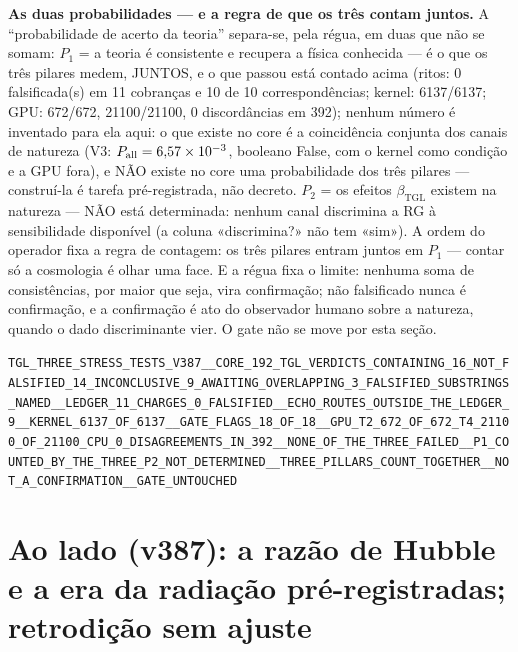 \documentclass[11pt]{article}
\newcommand{\bTGL}{\beta_{\mathrm{TGL}}}\newcommand{\Msun}{M_{\odot}}\newcommand{\TGL}{\mathrm{TGL}}
\theoremstyle{definition}\newtheorem{deriv}{Derivação}
\begin{document}
\textbf{As duas probabilidades --- e a regra de que os três contam juntos.} A ``probabilidade de acerto da teoria'' separa-se, pela régua, em duas que não se somam: $P_1$ = a teoria é consistente e recupera a física conhecida --- é o que os três pilares medem, JUNTOS, e o que passou está contado acima (ritos: 0 falsificada(s) em 11 cobranças e 10 de 10 correspondências; kernel: 6137/6137; GPU: 672/672, 21100/21100, 0 discordâncias em 392); nenhum número é inventado para ela aqui: o que existe no core é a coincidência conjunta dos canais de natureza (V3: $P_{\rm all}=6{,}57\times10^{-3}$, booleano False, com o kernel como condição e a GPU fora), e NÃO existe no core uma probabilidade dos três pilares --- construí-la é tarefa pré-registrada, não decreto. $P_2$ = os efeitos $\bTGL$ existem na natureza --- NÃO está determinada: nenhum canal discrimina a RG à sensibilidade disponível (a coluna «discrimina?» não tem «sim»). A ordem do operador fixa a regra de contagem: os três pilares entram juntos em $P_1$ --- contar só a cosmologia é olhar uma face. E a régua fixa o limite: nenhuma soma de consistências, por maior que seja, vira confirmação; não falsificado nunca é confirmação, e a confirmação é ato do observador humano sobre a natureza, quando o dado discriminante vier. O gate não se move por esta seção.

\begin{center}\small\texttt{TGL\_THREE\_STRESS\_TESTS\_V387\_\_CORE\_192\_TGL\_VERDICTS\_CONTAINING\_16\_NOT\_FALSIFIED\_14\_INCONCLUSIVE\_9\_AWAITING\_OVERLAPPING\_3\_FALSIFIED\_SUBSTRINGS\_NAMED\_\_LEDGER\_11\_CHARGES\_0\_FALSIFIED\_\_ECHO\_ROUTES\_OUTSIDE\_THE\_LEDGER\_9\_\_KERNEL\_6137\_OF\_6137\_\_GATE\_FLAGS\_18\_OF\_18\_\_GPU\_T2\_672\_OF\_672\_T4\_21100\_OF\_21100\_CPU\_0\_DISAGREEMENTS\_IN\_392\_\_NONE\_OF\_THE\_THREE\_FAILED\_\_P1\_COUNTED\_BY\_THE\_THREE\_P2\_NOT\_DETERMINED\_\_THREE\_PILLARS\_COUNT\_TOGETHER\_\_NOT\_A\_CONFIRMATION\_\_GATE\_UNTOUCHED}\end{center}

\section*{Ao lado (v387): a razão de Hubble e a era da radiação pré-registradas; retrodição sem ajuste}

\end{document}
